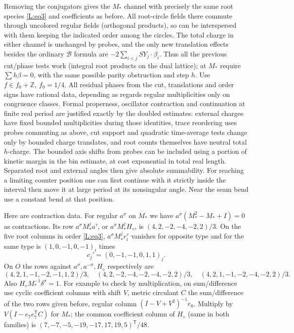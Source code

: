 \documentclass[11pt]{article}
\numberwithin{equation}{section}
\theoremstyle{definition}\newtheorem{definition}[theorem]{Definition}
\theoremstyle{remark}\newtheorem{remark}[theorem]{Remark}
\begin{document}
Removing the conjugators gives the \(M_*\) channel with precisely the same root species \eqref{L:eq3} and coefficients as before. All root-circle fields there commute through uncolored regular fields (orthogonal products), so can be interspersed with them keeping the indicated order among the circles. The total charge in either channel is unchanged by probes, and the only new translation effects besides the ordinary \(\mathcal B\) formula are \(-2\sum_{i<j}SY_j\cdot\beta_i\). Thus all the previous cut/phase tests work (integral root products on the dual lattice); at \(M_*\) require \(\sum h\beta=0\), with the same possible parity obstruction and step \(h\). Use \(f\in f_0+\mathbb Z,\ f_0=1/4\). All residual phases from the cut, translations and order signs have rational data, depending as regards regular multiplicities only on congruence classes. Formal properness, oscillator contraction and continuation at finite real period are justified exactly by the doubled estimates: external charges have fixed bounded multiplicities during those identities, trace reordering uses probes commuting as above, cut support and quadratic time-average tests change only by bounded charge translates, and root counts themselves have neutral total \(h\)-charge. The bounded axis shifts from probes can be included using a portion of kinetic margin in the bin estimate, at cost exponential in total real length. Separated root and external angles then give absolute summability. For reaching a limiting counter position one can first continue with it strictly inside the interval then move it at large period at its nonsingular angle. Near the seam bend use a constant bend at that position.

Here are contraction data. For regular \(a^\sigma\) on \(M_*\) we have \(a^\sigma(M_*^2-M_*+I)=0\) as contractions. Its row \(a^\sigma M_*^j a^\tau\), or \(a^\sigma M_*^j H_\diamond\), is \((4,2,-2,-4,-2,2)/3\). On the five root columns in order \eqref{L:eq3}, \(a^\sigma M_*^j r_i^\tau\) vanishes for opposite type and for the same type is \((1,0,-1,0,-1)_i\) times
\[
 c_j'=(0,-1,-1,0,1,1)_j .
\]
On \(O\) the rows against \(a^\sigma,a^{-\sigma},H_\diamond\) respectively are
\[
 (4,2,1,-1,-2,-1,1,2)/3,\quad
 (4,2,-2,-4,-2,-4,-2,2)/3,\quad
 (4,2,1,-1,-2,-4,-2,2)/3 .
\]
Also \(H_\diamond M_*^{-1}\delta^\sigma=1\). For example to check by multiplication, on sum/difference use cyclic coefficient columns with shift \(V\), metric circulant \(C\) the sum/difference of the two rows given before, regular column \((I-V+V^2)^{-1}e_0\). Multiply by \(V(I-e_7 e_7^{\mathsf T}C)\) for \(M_*\); the common coefficient column of \(H_\diamond\) (same in both families) is \((7,-7,-5,-19,-17,17,19,5)^{\mathsf T}/48\).
\end{document}
